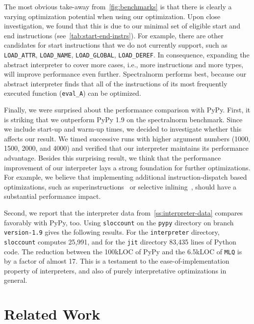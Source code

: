 \documentclass[preprint,10pt]{popl14conf}
\newcommand{\mlq}{\texttt{MLQ}}
\begin{document}
The most obvious take-away from~\autoref{fig:benchmarks} is that there is clearly a varying
optimization potential when using our optimization.
Upon close investigation, we found that this is due to our minimal set of eligible start and
end instructions (see~\autoref{tab:start-end-instrs}).
For example, there are other candidates for start instructions that we do not currently support,
such as \texttt{LOAD_ATTR}, \texttt{LOAD_NAME}, \texttt{LOAD_GLOBAL}, \texttt{LOAD_DEREF}.
In consequence, expanding the abstract interpreter to cover more cases, i.e., more instructions and
more types, will improve performance even further.
\textsf{Spectralnorm} performs best, because our abstract interpreter finds that all of the
instructions of its most frequently executed function (\texttt{eval_A}) can be optimized.

Finally, we were surprised about the performance comparison with PyPy.
First, it is striking that we outperform PyPy 1.9 on the \textsf{spectralnorm} benchmark.
Since we include start-up and warm-up times, we decided to investigate whether this affects our
result.
We timed successive runs with higher argument numbers (1000, 1500, 2000, and 4000) and verified that
our interpreter maintains its performance advantage.
Besides this surprising result, we think that the performance improvement of our interpreter lays a
strong foundation for further optimizations.
For example, we believe that implementing additional instruction-dispatch based optimizations, such
as superinstructions~\cite{proebsting+95,ertl.gregg+03} or selective
inlining~\cite{piumarta.riccardi+98}, should have a substantial performance impact.

Second, we report that the interpreter data from~\autoref{ss:interpreter-data} compares favorably with
PyPy, too.
Using \texttt{sloccount} on the \texttt{pypy} directory on branch \texttt{version-1.9} gives the
following results.
For the \texttt{interpreter} directory, \texttt{sloccount} computes 25,991, and for the \texttt{jit}
directory 83,435 lines of Python code.
The reduction between the 100kLOC of PyPy and the 6.5kLOC of \mlq{} is by a factor of almost
17.
This is a testament to the ease-of-implementation property of interpreters, and also of purely
interpretative optimizations in general.




\section{Related Work}\label{s:related-work}
\end{document}

